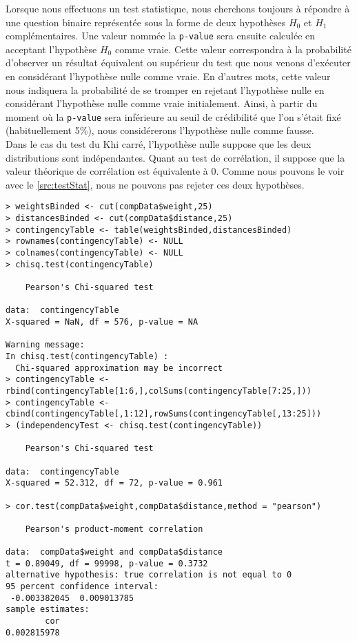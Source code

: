 Lorsque nous effectuons un test statistique, nous cherchons toujours à répondre à une question binaire représentée sous la forme de deux hypothèses $H_0$ et $H_1$ complémentaires. Une valeur nommée la \texttt{p-value} sera ensuite calculée en acceptant l'hypothèse $H_0$ comme vraie. Cette valeur correspondra à la probabilité d'observer un résultat équivalent ou supérieur du test que nous venons d'exécuter en considérant l'hypothèse nulle comme vraie. En d'autres mots, cette valeur nous indiquera la probabilité de se tromper en rejetant l'hypothèse nulle en considérant l'hypothèse nulle comme vraie initialement. Ainsi, à partir du moment où la \texttt{p-value} sera inférieure au seuil de crédibilité que l'on s'était fixé (habituellement 5\%), nous considérerons l'hypothèse nulle comme fausse. \\

Dans le cas du test du Khi carré, l'hypothèse nulle suppose que les deux distributions sont indépendantes. Quant au test de corrélation, il suppose que la valeur théorique de corrélation est équivalente à 0. Comme nous pouvons le voir avec le \autoref{src:testStat}, nous ne pouvons pas rejeter ces deux hypothèses. \\

\begin{lstlisting}[caption = Tests d'indépendance et de corrélation entre distributions,label=src:testStat]
> weightsBinded <- cut(compData$weight,25)
> distancesBinded <- cut(compData$distance,25)
> contingencyTable <- table(weightsBinded,distancesBinded)
> rownames(contingencyTable) <- NULL
> colnames(contingencyTable) <- NULL
> chisq.test(contingencyTable)

	Pearson's Chi-squared test

data:  contingencyTable
X-squared = NaN, df = 576, p-value = NA

Warning message:
In chisq.test(contingencyTable) :
  Chi-squared approximation may be incorrect
> contingencyTable <- rbind(contingencyTable[1:6,],colSums(contingencyTable[7:25,]))
> contingencyTable <- cbind(contingencyTable[,1:12],rowSums(contingencyTable[,13:25]))
> (independencyTest <- chisq.test(contingencyTable))

	Pearson's Chi-squared test

data:  contingencyTable
X-squared = 52.312, df = 72, p-value = 0.961

> cor.test(compData$weight,compData$distance,method = "pearson")

	Pearson's product-moment correlation

data:  compData$weight and compData$distance
t = 0.89049, df = 99998, p-value = 0.3732
alternative hypothesis: true correlation is not equal to 0
95 percent confidence interval:
 -0.003382045  0.009013785
sample estimates:
        cor
0.002815978
\end{lstlisting}

